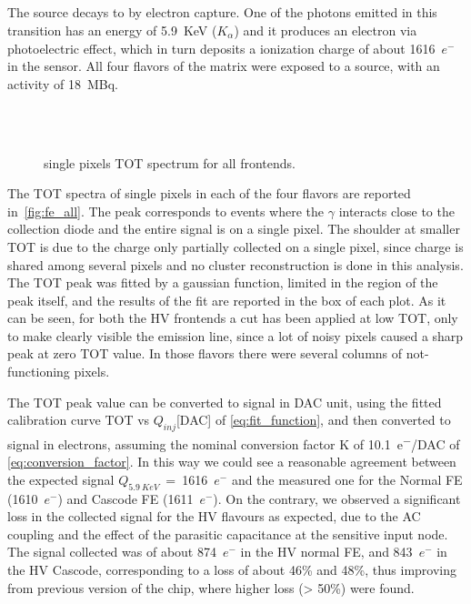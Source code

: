 \subsection{}

The  source decays to  by electron capture. One of the photons emitted in this transition has an energy of \SI{5.9}{KeV} ($K_{\alpha}$) and it produces an electron via photoelectric effect, which in turn deposits a ionization charge of about 1616~$e^{-}$ in the sensor. 
All four flavors of the matrix were exposed to a  source, with an activity of \SI{18}{MBq}.

\begin{figure}[h]
\centering
{}\quad
{}\\
\quad
{}\\
\caption{ single pixels TOT spectrum for all frontends.}
\label{fig:fe_all}
\end{figure}

The TOT spectra of single pixels in each of the four flavors are reported in~\autoref{fig:fe_all}. The peak corresponds to events where the $\gamma$ interacts close to the collection diode and the entire signal is on a single pixel. The shoulder at smaller TOT is due to the charge only partially collected on a single pixel, since charge is shared among several pixels and no cluster reconstruction is done in this analysis. The TOT peak was fitted by a gaussian function, limited in the region of the peak itself, and the results of the fit are reported in the box of each plot. As it can be seen, for both the HV frontends a cut has been applied at low TOT, only to make clearly visible the emission line, since a lot of noisy pixels caused a sharp peak at zero TOT value. In those flavors there were several columns of not-functioning pixels. 

The TOT peak value can be converted to signal in DAC unit, using the fitted calibration curve TOT vs $Q_{inj}$[DAC] of \autoref{eq:fit_function}, and then converted to signal in electrons, assuming the nominal conversion factor K of \SI{10.1}{e^{-}/DAC} of \autoref{eq:conversion_factor}. In this way we could see a reasonable agreement between the expected signal $Q_{\SI{5.9}{KeV}}$~=~1616~$e^{-}$ and the measured one for the Normal FE (1610~$e^{-}$) and Cascode FE (1611~$e^{-}$). On the contrary, we observed a significant loss in the collected signal for the HV flavours as expected, due to the AC coupling and the effect of the parasitic capacitance at the sensitive input node. The signal collected was of about 874~$e^{-}$ in the HV normal FE, and 843~$e^{-}$ in the HV Cascode, corresponding to a loss of about 46\% and 48\%, thus improving from previous version of the chip,  where higher loss (> 50\%) were found.

